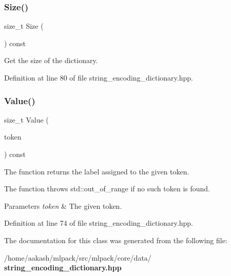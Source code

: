 \mbox{\label{classmlpack_1_1data_1_1StringEncodingDictionary_a58f4b9e873b7c1c7d512bd9f7d1489d8}} 
\subsubsection{Size()}
{\footnotesize\ttfamily size\+\_\+t Size (\begin{DoxyParamCaption}{ }\end{DoxyParamCaption}) const\hspace{0.3cm}{\ttfamily [inline]}}



Get the size of the dictionary. 



Definition at line 80 of file string\+\_\+encoding\+\_\+dictionary.\+hpp.

\mbox{\label{classmlpack_1_1data_1_1StringEncodingDictionary_afb15c4ab3b1af9a6ea7ee16d84360bd4}} 
\subsubsection{Value()}
{\footnotesize\ttfamily size\+\_\+t Value (\begin{DoxyParamCaption}\item[{const Token \&}]{token }\end{DoxyParamCaption}) const\hspace{0.3cm}{\ttfamily [inline]}}



The function returns the label assigned to the given token. 

The function throws std\+::out\+\_\+of\+\_\+range if no such token is found.


\begin{DoxyParams}{Parameters}
{\em token} & The given token. \\
\hline
\end{DoxyParams}


Definition at line 74 of file string\+\_\+encoding\+\_\+dictionary.\+hpp.



The documentation for this class was generated from the following file\+:\begin{DoxyCompactItemize}
\item 
/home/aakash/mlpack/src/mlpack/core/data/\textbf{ string\+\_\+encoding\+\_\+dictionary.\+hpp}\end{DoxyCompactItemize}
